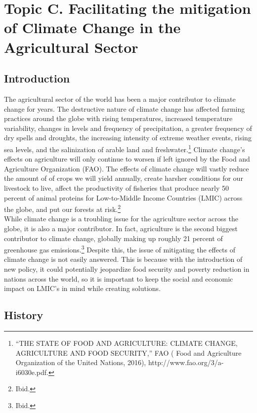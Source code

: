 \documentclass[10pt, letterpaper]{article}
\begin{document}
\newpage
\section{Topic C. Facilitating the mitigation of Climate Change in the
Agricultural Sector}

\subsection{Introduction}

The agricultural sector of the world has been a major contributor to
climate change for years. The destructive nature of climate change has
affected farming practices around the globe with rising temperatures,
increased temperature variability, changes in levels and frequency of
precipitation, a greater frequency of dry spells and droughts, the
increasing intensity of extreme weather events, rising sea levels, and
the salinization of arable land and freshwater.\footnote{``THE STATE OF
  FOOD AND AGRICULTURE: CLIMATE CHANGE, AGRICULTURE AND FOOD SECURITY,''
  FAO ( Food and Agriculture Organization of the United Nations, 2016),
  http://www.fao.org/3/a-i6030e.pdf.} Climate change's effects on
agriculture will only continue to worsen if left ignored by the Food and
Agriculture Organization (FAO). The effects of climate change will
vastly reduce the amount of of crops we will yield annually, create
harsher conditions for our livestock to live, affect the productivity of
fisheries that produce nearly 50 percent of animal proteins for
Low-to-Middle Income Countries (LMIC) across the globe, and put our
forests at risk.\footnote{Ibid.} \\

While climate change is a troubling issue for the agriculture sector
across the globe, it is also a major contributor. In fact, agriculture
is the second biggest contributor to climate change, globally making up
roughly 21 percent of greenhouse gas emissions.\footnote{Ibid.} Despite
this, the issue of mitigating the effects of climate change is not
easily answered. This is because with the introduction of new policy, it
could potentially jeopardize food security and poverty reduction in
nations across the world, so it is important to keep the social and
economic impact on LMIC's in mind while creating solutions. \\

\subsection{History}
\end{document}

